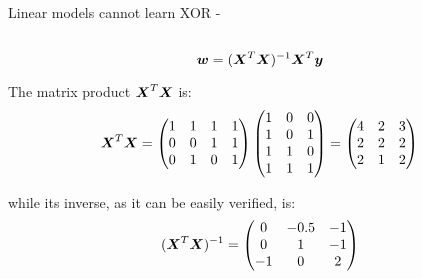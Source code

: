 \begin{frame}[t,allowframebreaks]{Linear models cannot learn XOR -}
\begin{columns}[t]
\begin{column}{0.60\textwidth}
        \end{column}
    \end{columns}

    \begin{equation}
        \boldsymbol{w} = (\boldsymbol{X}^T \boldsymbol{X})^{-1} \boldsymbol{X}^T \boldsymbol{y}
    \end{equation}        

    \framebreak

    The matrix product $\boldsymbol{X}^T \boldsymbol{X}$ is:
    \begin{equation}
        \boldsymbol{X}^T \boldsymbol{X} = 
        \begin{pmatrix}
            1 & 1 & 1 & 1 \\
            0 & 0 & 1 & 1 \\
            0 & 1 & 0 & 1 \\
        \end{pmatrix} 
        \begin{pmatrix}
            1 & 0 & 0 \\
            1 & 0 & 1 \\
            1 & 1 & 0 \\
            1 & 1 & 1 \\
        \end{pmatrix} =
        \begin{pmatrix}
            4 & 2 & 3 \\
            2 & 2 & 2 \\
            2 & 1 & 2 \\
        \end{pmatrix} 
    \end{equation}        

    while its inverse, as it can be easily verified, is:
    \begin{equation}
        (\boldsymbol{X}^T \boldsymbol{X})^{-1} = 
        \begin{pmatrix}
            0 & -0.5 & -1 \\
            0 &  1   & -1 \\
           -1 &  0   &  2 \\
        \end{pmatrix} 
    \end{equation}        


\end{frame}
